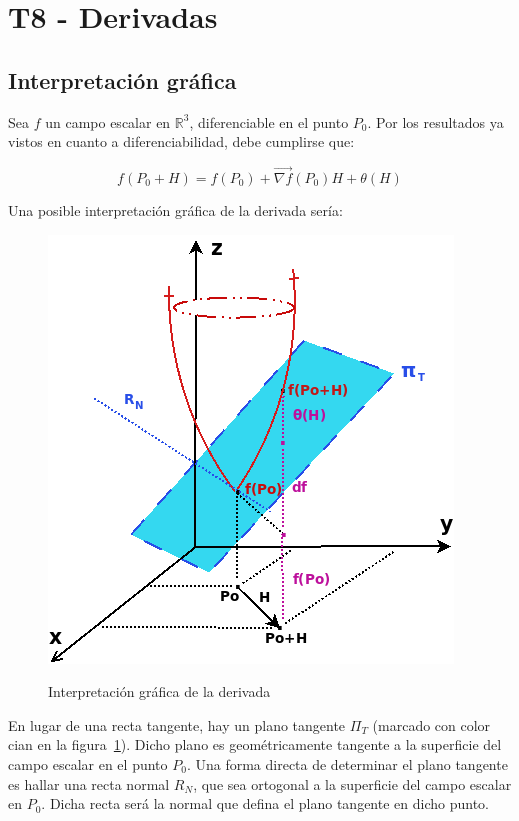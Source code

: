 \documentclass{article}
\renewcommand{\Bbb}{\mathbb}
\begin{document}
\section{T8 - Derivadas}

\subsection{Interpretación gráfica}

Sea $f$ un campo escalar en $\Bbb R^3$, diferenciable en el punto $P_0$. Por los resultados ya vistos en cuanto a diferenciabilidad, debe cumplirse que:

\begin{equation}
f(P_0 + H) = f(P_0) + \overrightarrow{\nabla{f}}(P_0) H + \theta(H)
\end{equation}

Una posible interpretación gráfica de la derivada sería:

\begin{figure}[ht]
\caption{Interpretación gráfica de la derivada}
\centering
\includegraphics[scale=0.6]{img/teo_fig006_dg.png} 
\label{fig:deriv_graf}
\end{figure}

En lugar de una recta tangente, hay un plano tangente $\Pi_T$ (marcado con color cian en la figura~\ref{fig:deriv_graf}). Dicho plano es geométricamente tangente a la superficie del campo escalar en el punto $P_0$. Una forma directa de determinar el plano tangente es hallar una recta normal $R_N$, que sea ortogonal a la superficie del campo escalar en $P_0$. Dicha recta será la normal que defina el plano tangente en dicho punto.
\end{document}
